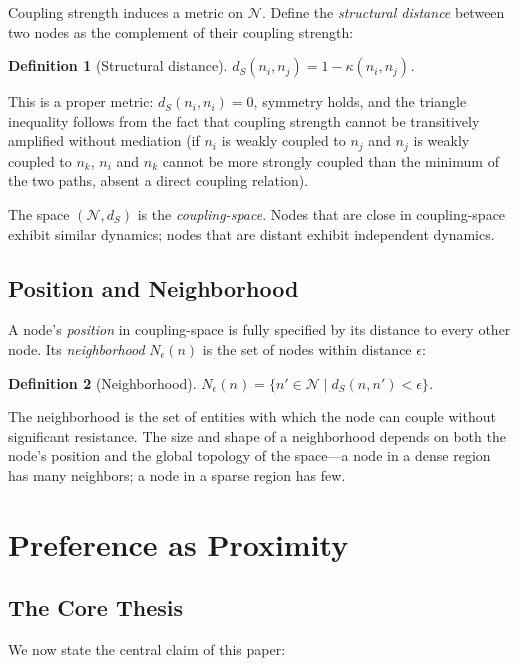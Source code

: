 \documentclass[12pt,a4paper]{article}
\newtheorem{definition}{Definition}[section]
\begin{document}
Coupling strength induces a metric on $\mathcal{N}$. Define the \emph{structural distance} between two nodes as the complement of their coupling strength:

\begin{definition}[Structural distance]
$d_S(n_i, n_j) = 1 - \kappa(n_i, n_j)$.
\end{definition}

This is a proper metric: $d_S(n_i,n_i)=0$, symmetry holds, and the triangle inequality follows from the fact that coupling strength cannot be transitively amplified without mediation (if $n_i$ is weakly coupled to $n_j$ and $n_j$ is weakly coupled to $n_k$, $n_i$ and $n_k$ cannot be more strongly coupled than the minimum of the two paths, absent a direct coupling relation).

The space $(\mathcal{N}, d_S)$ is the \emph{coupling-space}. Nodes that are close in coupling-space exhibit similar dynamics; nodes that are distant exhibit independent dynamics.

\subsection{Position and Neighborhood}

A node's \emph{position} in coupling-space is fully specified by its distance to every other node. Its \emph{neighborhood} $N_\epsilon(n)$ is the set of nodes within distance $\epsilon$:

\begin{definition}[Neighborhood]
$N_\epsilon(n) = \{ n' \in \mathcal{N} \mid d_S(n, n') < \epsilon \}$.
\end{definition}

The neighborhood is the set of entities with which the node can couple without significant resistance. The size and shape of a neighborhood depends on both the node's position and the global topology of the space---a node in a dense region has many neighbors; a node in a sparse region has few.

\section{Preference as Proximity}

\subsection{The Core Thesis}

We now state the central claim of this paper:
\end{document}
